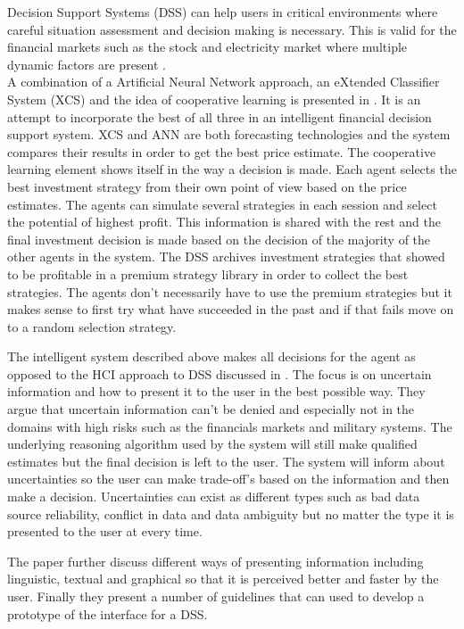 Decision Support Systems (DSS) can help users in critical environments where careful situation assessment and decision making is necessary. This is valid for the financial markets such as the stock and electricity market where multiple dynamic factors are present \cite{UncertainInformation}.
\\[0.5cm]
A combination of a Artificial Neural Network approach, an eXtended Classifier System (XCS) and the idea of cooperative learning is presented in \cite{groupLearningDS}. It is an attempt to incorporate the best of all three in an intelligent financial decision support system. XCS and ANN are both forecasting technologies and the system compares their results in order to get the best price estimate. The cooperative learning element shows itself in the way a decision is made. Each agent selects the best investment strategy from their own point of view based on the price estimates. The agents can simulate several strategies in each session and select the potential of highest profit. This information is shared with the rest and the final investment decision is made based on the decision of the majority of the other agents in the system. The DSS archives investment strategies that showed to be profitable in a premium strategy library in order to collect the best strategies. The agents don't necessarily have to use the premium strategies but it makes sense to first try what have succeeded in the past and if that fails move on to a random selection strategy. 

The intelligent system described above makes all decisions for the agent as opposed to the HCI approach to DSS discussed in \cite{UncertainInformation}. The focus is on uncertain information and how to present it to the user in the best possible way. They argue that uncertain information can't be denied and especially not in the domains with high risks such as the financials markets and military systems. The underlying reasoning algorithm used by the system will still make qualified estimates but the final decision is left to the user. The system will inform about uncertainties so the user can make trade-off's based on the information and then make a decision. Uncertainties can exist as different types such as bad data source reliability, conflict in data and data ambiguity but no matter the type it is presented to the user at every time. 

The paper \cite{UncertainInformation} further discuss different ways of presenting information including linguistic, textual and graphical so that it is perceived better and faster by the user. Finally they present a number of guidelines that can used to develop a prototype of the interface for a DSS.